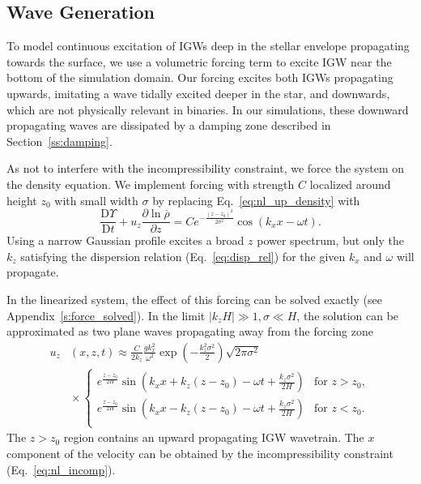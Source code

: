 \documentclass[
        fleqn,
        usenatbib,
    ]{mnras}
\newcommand*{\pd}[2]{\frac{\partial#1}{\partial#2}}
\newcommand*{\md}[2]{\frac{\mathrm{D}#1}{\mathrm{D}#2}}
\newcommand*{\abs}[1]{\left|#1\right|}
\newcommand*{\p}[1]{\left(#1\right)}
\begin{document}
\subsection{Wave Generation}\label{ss:forcing}

To model continuous excitation of IGWs deep in the stellar envelope propagating
towards the surface, we use a volumetric forcing term to excite IGW near the
bottom of the simulation domain. Our forcing excites both IGWs
propagating upwards, imitating a wave tidally excited deeper in the star, and
downwards, which are not physically relevant in binaries. In our simulations,
these downward propagating waves are dissipated by a damping zone described in
Section~\ref{ss:damping}.

As not to interfere with the incompressibility constraint, we force the system
on the density equation. We implement forcing with strength $C$ localized around
height $z_0$ with small width $\sigma$ by replacing Eq.~\eqref{eq:nl_up_density}
with
\begin{equation}
    \md{\Upsilon}{t} + u_{z}\pd{\ln \overline{\rho}}{z}
        = Ce^{-\frac{(z - z_0)^2}{2\sigma^2}}
            \cos \p{k_{x}x - \omega t}.\label{eq:vol_drive}
\end{equation}
Using a narrow Gaussian profile excites a broad $z$ power spectrum, but only the
$k_{z}$ satisfying the dispersion relation (Eq.~\ref{eq:disp_rel}) for the given
$k_{x}$ and $\omega$ will propagate.

In the linearized system, the effect of this forcing can be solved exactly
(see Appendix~\ref{s:force_solved}). In the limit $\abs{k_zH} \gg 1, \sigma
\ll H$, the solution can be approximated as two plane waves propagating away
from the forcing zone
\begin{align}
    u_{z}&(x, z, t) \approx{} \frac{C}{2k_z}\frac{gk_x^2}{\omega^2}
        \exp\p{-\frac{k_z^2\sigma^2}{2}}
        \sqrt{2\pi \sigma^2} \nonumber\\
        &{}\times\begin{cases}
        e^{\frac{z - z_0}{2H}}\sin\p{k_{x}x + k_{z}(z - z_0) - \omega t
            + \frac{k_z\sigma^2}{2H}}
            & \text{for }z > z_0,\\[5pt]
        e^{\frac{z - z_0}{2H}}\sin\p{k_{x}x - k_{z}(z - z_0) - \omega t
            + \frac{k_z\sigma^2}{2H}}
            & \text{for }z < z_0.\\
    \end{cases}\label{eq:uz_lin}
\end{align}
The $z > z_0$ region contains an upward propagating IGW wavetrain. The $x$
component of the velocity can be obtained by the incompressibility constraint
(Eq.~\ref{eq:nl_incomp}).
\end{document}
